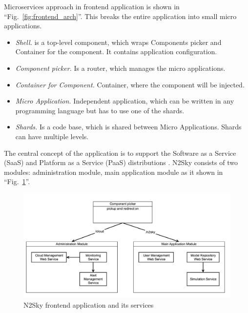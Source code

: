 Microservices approach in frontend application is shown in ``Fig.~\ref{fig:frontend_arch}''. This breaks the entire application into small micro applications.

\begin{itemize}
\item \emph{Shell.}  is a top-level component, which wraps Components picker and Container for the component. It contains application configuration.
\item \emph{Component picker.} Is a router, which manages the micro applications. 
\item \emph{Container for Component.} Container, where the component will be injected.
\item \emph{Micro Application.} Independent application, which can be written in any programming language but has to use one of the shards.
\item \emph{Shards.} Is a code base, which is shared between Micro Applications. Shards can have multiple levels. 
\end{itemize}
 

The central concept of the application is to support the Software as a Service (SaaS) and Platform as a Service (PaaS) distributions \cite{Walraven2014}.  N2Sky consists of two modules: administration module, main application module as it shown in ``Fig.~\ref{fig:modular_design}''.

\begin{figure}[htbp]
\begin{center}
  \includegraphics[width=\linewidth]{components/2/redirector.png}
  \caption{N2Sky frontend application and its services}
  \label{fig:modular_design}
\end{center}
\end{figure}

